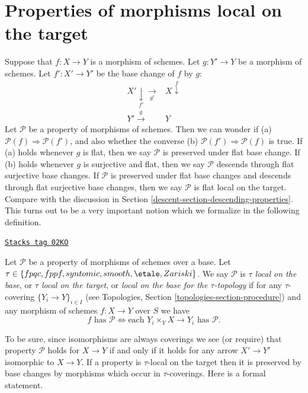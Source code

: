 \section{Properties of morphisms local on the target}
\label{descent-section-descending-properties-morphisms}
Suppose that $f : X \to Y$ is a morphism of schemes.
Let $g : Y' \to Y$ be a morphism of schemes.
Let $f' : X' \to Y'$ be the base change of $f$ by $g$:
$$
\begin{array}{cc}X' \underset{f'}{\downarrow}\underset{g'}{\longrightarrow} & X \overset{f}{\downarrow} \\ Y' \overset{g}{\longrightarrow} & Y\end{array}
$$
Let $\mathcal{P}$ be a property of morphisms of schemes.
Then we can wonder if (a) $\mathcal{P}(f) \Rightarrow \mathcal{P}(f')$,
and also whether the converse (b) $\mathcal{P}(f') \Rightarrow \mathcal{P}(f)$
is true. If (a) holds whenever $g$ is flat, then we say $\mathcal{P}$
is preserved under flat base change. If (b) holds whenever $g$ is
surjective and flat, then we say $\mathcal{P}$ descends through
flat surjective base changes. If $\mathcal{P}$ is preserved under
flat base changes and descends through flat surjective base changes,
then we say $\mathcal{P}$ is flat local on the target.
Compare with the discussion in
Section \ref{descent-section-descending-properties}.
This turns out to be a very important notion which
we formalize in the following definition.

\begin{definition}
\label{descent-definition-property-morphisms-local}
\href{https://stacks.math.columbia.edu/tag/02KO}{\texttt{Stacks tag 02KO}}

Let $\mathcal{P}$ be a property of morphisms of schemes over a base.
Let $\tau \in \{fpqc, fppf, syntomic, smooth, \etale, Zariski\}$.
We say $\mathcal{P}$ is {\it $\tau$ local on the base}, or
{\it $\tau$ local on the target}, or
{\it local on the base for the $\tau$-topology} if for any
$\tau$-covering $\{Y_i \to Y\}_{i \in I}$ (see
Topologies, Section \ref{topologies-section-procedure})
and any morphism of schemes $f : X \to Y$ over $S$ we
have
$$
f \text{ has }\mathcal{P}
\Leftrightarrow
\text{each }Y_i \times_Y X \to Y_i\text{ has }\mathcal{P}.
$$
\end{definition}

To be sure, since isomorphisms are always coverings
we see (or require) that property $\mathcal{P}$ holds for $X \to Y$
if and only if it holds for any arrow $X' \to Y'$ isomorphic to $X \to Y$.
If a property is $\tau$-local on the target then it is preserved
by base changes by morphisms which occur in $\tau$-coverings. Here
is a formal statement.

